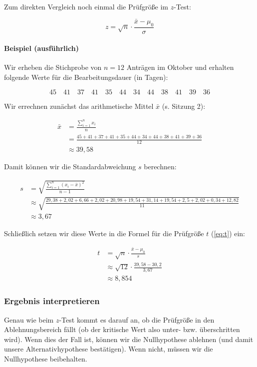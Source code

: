 \documentclass[
  ngerman,
]{article}
\begin{document}
Zum direkten Vergleich noch einmal die Prüfgröße im \(z\)-Test:

\[
z=\sqrt{n}\cdot\frac{\bar{x}-\mu_0}{\sigma}
\]

\hypertarget{beispiel-ausfuxfchrlich}{%
\paragraph{Beispiel (ausführlich)}\label{beispiel-ausfuxfchrlich}}

Wir erheben die Stichprobe von \(n=12\) Anträgen im Oktober und erhalten folgende Werte für die Bearbeitungsdauer (in Tagen):

\[
45\quad41\quad37\quad41\quad35\quad44\quad34\quad44\quad38\quad41\quad39\quad36
\]

Wir errechnen zunächst das arithmetische Mittel \(\bar{x}\) (s. Sitzung 2):

\[\begin{aligned}
\bar{x}&=\frac{\sum\limits_{i=1}^nx_i}{n}\\[5pt]
&=\frac{45+41+37+41+35+44+34+44+38+41+39+36}{12}\\
&\approx 39{,}58
\end{aligned}\]

Damit können wir die Standardabweichung \(s\) berechnen:

\[\begin{aligned}
s&=\sqrt{\frac{\sum\limits_{i=1}^n(x_i-\bar{x})^2}{n-1}}\\[6pt]
&\approx\sqrt{\frac{29{,}38+2{,}02+6{,}66+2{,}02+20{,}98+19{,}54+31{,}14+19{,}54+2{,}5+2{,}02+0{,}34+12{,}82}{11}}\\
&\approx 3{,}67
\end{aligned}\]

Schließlich setzen wir diese Werte in die Formel für die Prüfgröße \(t\) (\autoref{eq:t}) ein:

\[\begin{aligned}
t&=\sqrt{n}\cdot\frac{\bar{x}-\mu_0}{s}\\[6pt]
&\approx\sqrt{12}\cdot\frac{39{,}58-30{,}2}{3{,}67}\\
&\approx8{,}854
\end{aligned}\]

\hypertarget{ergebnis-interpretieren}{%
\subsubsection{Ergebnis interpretieren}\label{ergebnis-interpretieren}}

Genau wie beim \(z\)-Test kommt es darauf an, ob die Prüfgröße in den Ablehnungsbereich fällt (ob der kritische Wert also unter- bzw. überschritten wird). Wenn dies der Fall ist, können wir die Nullhypothese ablehnen (und damit unsere Alternativhypothese bestätigen). Wenn nicht, müssen wir die Nullhypothese beibehalten.
\end{document}
